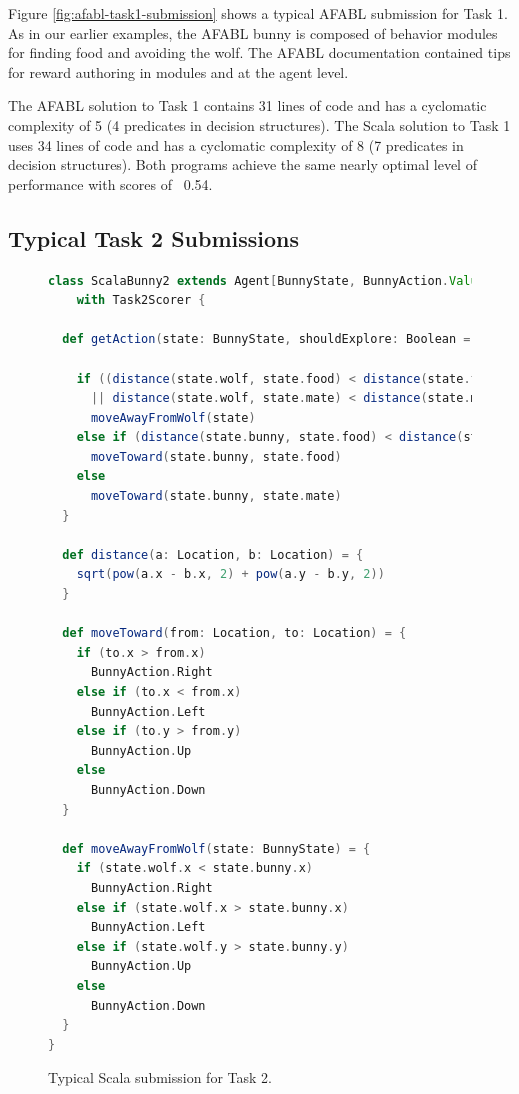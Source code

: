Figure \ref{fig:afabl-task1-submission} shows a typical AFABL submission for Task 1. As in our earlier examples, the AFABL bunny is composed of behavior modules for finding food and avoiding the wolf. The AFABL documentation contained tips for reward authoring in modules and at the agent level.

The AFABL solution to Task 1 contains 31 lines of code and has a cyclomatic complexity of 5 (4 predicates in decision structures). The Scala solution to Task 1 uses 34 lines of code and has a cyclomatic complexity of 8 (7 predicates in decision structures). Both programs achieve the same nearly optimal level of performance with scores of ~0.54. 

\subsection{Typical Task 2 Submissions}

\begin{figure}[!h]
\begin{center}

\begin{lstlisting}[language=Scala]
class ScalaBunny2 extends Agent[BunnyState, BunnyAction.Value]
    with Task2Scorer {

  def getAction(state: BunnyState, shouldExplore: Boolean = false) = {

    if ((distance(state.wolf, state.food) < distance(state.food, state.bunny))
      || distance(state.wolf, state.mate) < distance(state.mate, state.bunny))
      moveAwayFromWolf(state)
    else if (distance(state.bunny, state.food) < distance(state.bunny, state.mate))
      moveToward(state.bunny, state.food)
    else
      moveToward(state.bunny, state.mate)
  }

  def distance(a: Location, b: Location) = {
    sqrt(pow(a.x - b.x, 2) + pow(a.y - b.y, 2))
  }

  def moveToward(from: Location, to: Location) = {
    if (to.x > from.x)
      BunnyAction.Right
    else if (to.x < from.x)
      BunnyAction.Left
    else if (to.y > from.y)
      BunnyAction.Up
    else
      BunnyAction.Down
  }

  def moveAwayFromWolf(state: BunnyState) = {
    if (state.wolf.x < state.bunny.x)
      BunnyAction.Right
    else if (state.wolf.x > state.bunny.x)
      BunnyAction.Left
    else if (state.wolf.y > state.bunny.y)
      BunnyAction.Up
    else
      BunnyAction.Down
  }
}
\end{lstlisting}

\caption{Typical Scala submission for Task 2.}
\end{center}
\label{fig:scala-task2-submission}
\end{figure}

